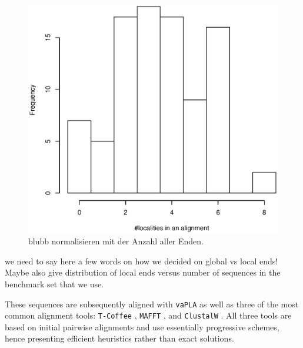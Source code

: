 \documentclass[a4paper,10pt]{article}
\let\cite\citep
\newcommand{\TODO}[1]{\begingroup\color{red}#1\endgroup}
\newcommand{\SAFTWARE}{\texttt{vaPLA}} %
\begin{document}
\begin{figure}
	\begin{center}
		\includegraphics[width=1\columnwidth]{localitiesDistribution.eps}
	\end{center}
\caption{blubb \TODO{normalisieren mit der Anzahl aller Enden.}}
\label{fig:locs}
\end{figure}

\TODO{we need to say here a few words on how we decided on global vs local
  ends! Maybe also give distribution of local ends versus number of
  sequences in the benchmark set that we use.}

These sequences are subsequently aligned with \SAFTWARE{} as well as three
of the most common alignment tools: \texttt{T-Coffee} \cite{Notredame:00},
\texttt{MAFFT} \cite{Katoh:05}, and \texttt{ClustalW} \cite{Larkin:07}. All
three tools are based on initial pairwise alignments and use essentially
progressive schemes, hence presenting efficient heuristics rather than
exact solutions.
\end{document}
